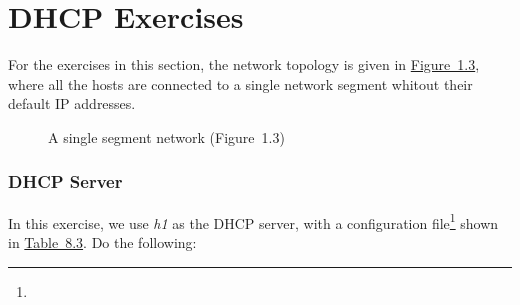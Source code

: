\documentclass{../UTNetLab}
\begin{document}
\part{DHCP Exercises}
For the exercises in this section, the network topology is given in \hyperref[fig:1.3]{Figure~1.3}, where all the hosts are connected to a single network segment whitout their default IP addresses.

\begin{center}
    \begin{minipage}{0.48\textwidth}
        \begin{flushright}
            \begin{figure}[H]
                \centering
                \caption{A single segment network (Figure~1.3)}
                \label{fig:1.3}
            \end{figure}
        \end{flushright}
    \end{minipage}
\end{center}

\section{DHCP Server}
In this exercise, we use \textit{h1} as the DHCP server, with a configuration file\footnote{} shown in \hyperref[tab:8.3]{Table~8.3}.
Do the following:
\end{document}
